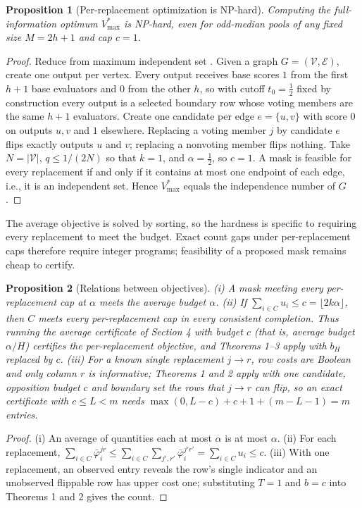 \documentclass[11pt]{article}
\newtheorem{proposition}{Proposition}
\newcommand{\bH}{b_H}
\begin{document}
\begin{proposition}[Per-replacement optimization is NP-hard]
\label{prop:nphard}
Computing the full-information optimum $V^*_{\max}$ is NP-hard, even for odd-median pools of any fixed size $M=2h+1$ and cap $c=1$.
\end{proposition}
\begin{proof}
Reduce from maximum independent set \citep{garey1979computers}. Given a graph $G=(\mathcal V,\mathcal E)$, create one output per vertex. Every output receives base scores $1$ from the first $h+1$ base evaluators and $0$ from the other $h$, so with cutoff $t_0=\frac12$ fixed by construction every output is a selected boundary row whose voting members are the same $h+1$ evaluators. Create one candidate per edge $e=\{u,v\}$ with score $0$ on outputs $u,v$ and $1$ elsewhere. Replacing a voting member $j$ by candidate $e$ flips exactly outputs $u$ and $v$; replacing a nonvoting member flips nothing. Take $N=|\mathcal V|$, $q\le1/(2N)$ so that $k=1$, and $\alpha=\frac12$, so $c=1$. A mask is feasible for every replacement if and only if it contains at most one endpoint of each edge, i.e., it is an independent set. Hence $V^*_{\max}$ equals the independence number of $G$.
\end{proof}
The average objective is solved by sorting, so the hardness is specific to requiring every replacement to meet the budget. Exact count gaps under per-replacement caps therefore require integer programs; feasibility of a proposed mask remains cheap to certify.

\begin{proposition}[Relations between objectives]
\label{prop:relations}
(i) A mask meeting every per-replacement cap at $\alpha$ meets the average budget $\alpha$. (ii) If $\sum_{i\in C}u_i\le c=\lfloor 2k\alpha\rfloor$, then $C$ meets every per-replacement cap in every consistent completion. Thus running the average certificate of Section 4 with budget $c$ (that is, average budget $\alpha/H$) certifies the per-replacement objective, and Theorems 1--3 apply with $\bH$ replaced by $c$. (iii) For a known single replacement $j\to r$, row costs are Boolean and only column $r$ is informative; Theorems 1 and 2 apply with one candidate, opposition budget $c$ and boundary set the rows that $j\to r$ can flip, so an exact certificate with $c\le L<m$ needs $\max(0,L-c)+c+1+(m-L-1)=m$ entries.
\end{proposition}
\begin{proof}
(i) An average of quantities each at most $\alpha$ is at most $\alpha$. (ii) For each replacement, $\sum_{i\in C}\bar\varphi_i^{jr}\le\sum_{i\in C}\sum_{j',r'}\bar\varphi_i^{j'r'}=\sum_{i\in C}u_i\le c$. (iii) With one replacement, an observed entry reveals the row's single indicator and an unobserved flippable row has upper cost one; substituting $T=1$ and $b=c$ into Theorems 1 and 2 gives the count.
\end{proof}
\end{document}
